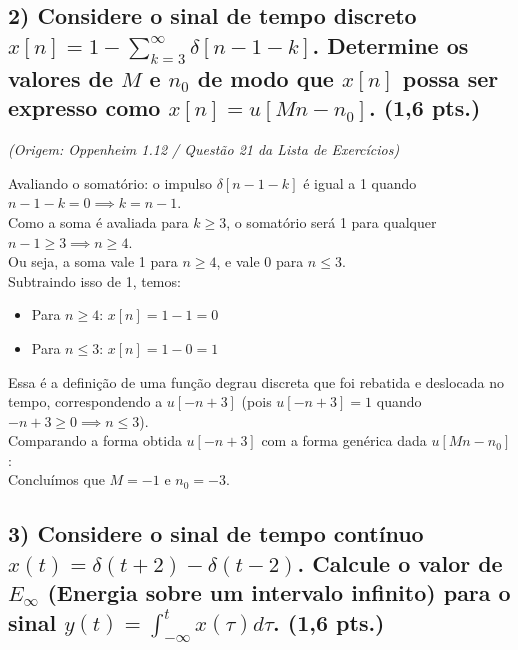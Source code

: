 \subsection{\texorpdfstring{2) Considere o sinal de tempo discreto \(x[n] = 1 - \sum_{k=3}^{\infty} \delta[n - 1 - k]\). Determine os valores de \(M\) e \(n_0\) de modo que \(x[n]\) possa ser expresso como \(x[n] = u[Mn - n_0]\). (1,6 pts.)}{2) Considere o sinal de tempo discreto…}}\label{considere-o-sinal-de-tempo-discreto-xn-1---sum_k3infty-deltan---1---k.-determine-os-valores-de-m-e-n_0-de-modo-que-xn-possa-ser-expresso-como-xn-umn---n_0.-16-pts.}

\emph{(Origem: Oppenheim 1.12 / Questão 21 da Lista de Exercícios)}

Avaliando o somatório: o impulso \(\delta[n - 1 - k]\) é igual a 1 quando \(n - 1 - k = 0 \implies k = n - 1\).\\
Como a soma é avaliada para \(k \ge 3\), o somatório será 1 para qualquer \(n - 1 \ge 3 \implies n \ge 4\).\\
Ou seja, a soma vale 1 para \(n \ge 4\), e vale 0 para \(n \le 3\).\\
Subtraindo isso de 1, temos:

\begin{itemize}
\tightlist
\item
  Para \(n \ge 4\): \(x[n] = 1 - 1 = 0\)
\item
  Para \(n \le 3\): \(x[n] = 1 - 0 = 1\)
\end{itemize}

Essa é a definição de uma função degrau discreta que foi rebatida e deslocada no tempo, correspondendo a \(u[-n + 3]\) (pois \(u[-n+3] = 1\) quando \(-n + 3 \ge 0 \implies n \le 3\)).\\
Comparando a forma obtida \(u[-n + 3]\) com a forma genérica dada \(u[Mn - n_0]\):\\
Concluímos que \textbf{\(M = -1\)} e \textbf{\(n_0 = -3\)}.

\subsection{\texorpdfstring{3) Considere o sinal de tempo contínuo \(x(t) = \delta(t + 2) - \delta(t - 2)\). Calcule o valor de \(E_\infty\) (Energia sobre um intervalo infinito) para o sinal \(y(t) = \int_{-\infty}^{t} x(\tau) d\tau\). (1,6 pts.)}{3) Considere o sinal de tempo contínuo…}}\label{considere-o-sinal-de-tempo-contuxednuo-xt-deltat-2---deltat---2.-calcule-o-valor-de-e_infty-energia-sobre-um-intervalo-infinito-para-o-sinal-yt-int_-inftyt-xtau-dtau.-16-pts.}


